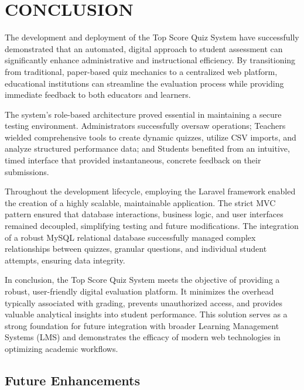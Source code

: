 \chapter{CONCLUSION}

The development and deployment of the Top Score Quiz System have successfully demonstrated that an automated, digital approach to student assessment can significantly enhance administrative and instructional efficiency. By transitioning from traditional, paper-based quiz mechanics to a centralized web platform, educational institutions can streamline the evaluation process while providing immediate feedback to both educators and learners. 

The system's role-based architecture proved essential in maintaining a secure testing environment. Administrators successfully oversaw operations; Teachers wielded comprehensive tools to create dynamic quizzes, utilize CSV imports, and analyze structured performance data; and Students benefited from an intuitive, timed interface that provided instantaneous, concrete feedback on their submissions.

Throughout the development lifecycle, employing the Laravel framework enabled the creation of a highly scalable, maintainable application. The strict MVC pattern ensured that database interactions, business logic, and user interfaces remained decoupled, simplifying testing and future modifications. The integration of a robust MySQL relational database successfully managed complex relationships between quizzes, granular questions, and individual student attempts, ensuring data integrity.

In conclusion, the Top Score Quiz System meets the objective of providing a robust, user-friendly digital evaluation platform. It minimizes the overhead typically associated with grading, prevents unauthorized access, and provides valuable analytical insights into student performance. This solution serves as a strong foundation for future integration with broader Learning Management Systems (LMS) and demonstrates the efficacy of modern web technologies in optimizing academic workflows.  

\section{Future Enhancements}

